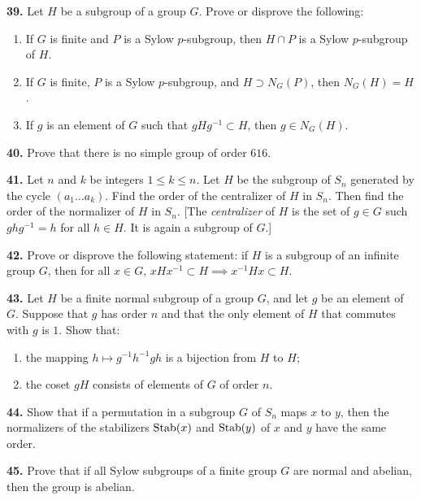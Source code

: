 \documentclass[a4paper,11pt,final]{memoir}%
\theoremstyle{nonumberplain}
\begin{document}
\medskip\noindent\textbf{39.} Let $H$ be a subgroup of a group $G$. Prove or
disprove the following:

\begin{enumerate}
\item If $G$ is finite and $P$ is a Sylow $p$-subgroup, then $H\cap P$ is a
Sylow $p$-subgroup of $H$.

\item If $G$ is finite, $P$ is a Sylow $p$-subgroup, and $H\supset N_{G}(P)$,
then $N_{G}(H)=H$.

\item If $g$ is an element of $G$ such that $gHg^{-1}\subset H$, then $g\in
N_{G}(H)$.
\end{enumerate}

\medskip\noindent\textbf{40.} Prove that there is no simple group of order
$616$.

\medskip\noindent\textbf{41.} Let $n$ and $k$ be integers $1\leq k\leq n$. Let
$H$ be the subgroup of $S_{n}$ generated by the cycle $(a_{1}\ldots a_{k})$.
Find the order of the centralizer of $H$ in $S_{n}$. Then find the order of
the normalizer of $H$ in $S_{n}$. [The \emph{centralizer}%
%
\emph{ }of $H$ is the set of $g\in G$ such $ghg^{-1}=h$ for all $h\in H$. It
is again a subgroup of $G$.]

\medskip\noindent\textbf{42.} Prove or disprove the following statement: if
$H$ is a subgroup of an infinite group $G$, then for all $x\in G$,
$xHx^{-1}\subset H\implies x^{-1}Hx\subset H$.

\medskip\noindent\textbf{43.} Let $H$ be a finite normal subgroup of a group
$G$, and let $g$ be an element of $G$. Suppose that $g$ has order $n$ and that
the only element of $H$ that commutes with $g$ is $1$. Show that:

\begin{enumerate}
\item the mapping $h\mapsto g^{-1}h^{-1}gh$ is a bijection from $H$ to $H$;

\item the coset $gH$ consists of elements of $G$ of order $n$.
\end{enumerate}

\medskip\noindent\textbf{44.} Show that if a permutation in a subgroup $G$ of
$S_{n}$ maps $x$ to $y$, then the normalizers of the stabilizers $\operatorname{Stab}(x) $
and $\operatorname{Stab}(y)$ of $x$ and $y$ have the same order.

\medskip\noindent\textbf{45.} Prove that if all Sylow subgroups of a finite
group $G$ are normal and abelian, then the group is abelian.
\end{document}
